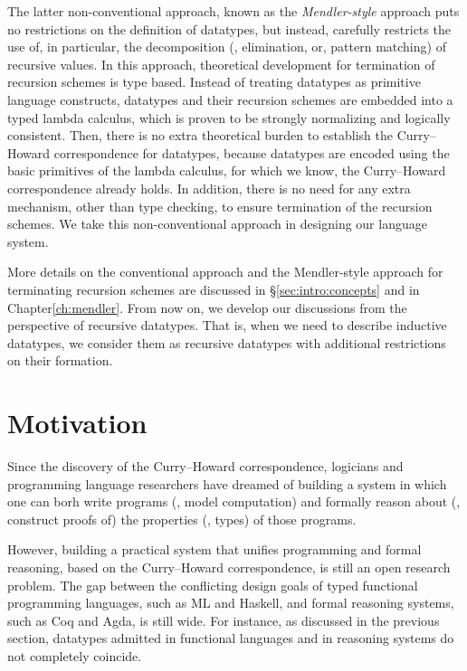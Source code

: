 The latter non-conventional approach, known as the \emph{Mendler-style} approach
puts no restrictions on the definition of datatypes, but instead, carefully
restricts the use of, in particular, the decomposition (\ie, elimination, or,
pattern matching) of recursive values. In this approach, theoretical
development for termination of recursion schemes is type based.
Instead of treating datatypes as primitive language constructs, datatypes
and their recursion schemes are embedded into a typed lambda calculus,
which is proven to be strongly normalizing and logically consistent.
Then, there is no extra theoretical burden to establish
the Curry--Howard correspondence for datatypes, because datatypes are
encoded using the basic primitives of the lambda calculus, for which we
know, the Curry--Howard correspondence already holds. In addition, there is
no need for any extra mechanism, other than type checking, to ensure
termination of the recursion schemes. We take this non-conventional
approach in designing our language system.

More details on the conventional approach and the Mendler-style approach
for terminating recursion schemes are discussed in \S\ref{sec:intro:concepts}
and in Chapter\;\ref{ch:mendler}. From now on, we develop our discussions
from the perspective of recursive datatypes. That is, when we need to describe
inductive datatypes, we consider them as recursive datatypes with additional
restrictions on their formation.

\section{Motivation}\label{sec:intro:motiv}
Since the discovery of the Curry--Howard correspondence, logicians and
programming language researchers have dreamed of building a system in which
one can borh write programs (\ie, model computation) and formally reason about
(\ie, construct proofs of) the properties (\ie, types) of those programs.

However, building a practical system that unifies programming and
formal reasoning, based on the Curry--Howard correspondence, is still
an open research problem. The gap between the conflicting design goals of
typed functional programming languages, such as ML and Haskell, and
formal reasoning systems, such as Coq and Agda, is still wide. For instance,
as discussed in the previous section, datatypes admitted in
functional languages and in reasoning systems do not completely coincide.

